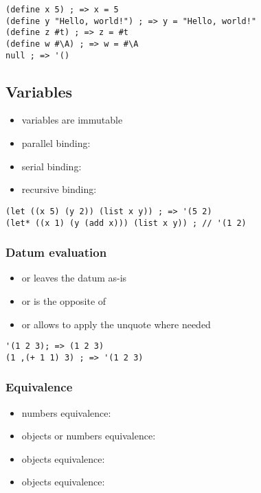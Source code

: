 \documentclass[a4paper,landscape,10pt]{article}
\begin{document}
\begin{multicols*}{2}
  \begin{lstlisting}[language=Racket]
(define x 5) ; => x = 5
(define y "Hello, world!") ; => y = "Hello, world!"
(define z #t) ; => z = #t
(define w #\A) ; => w = #\A
null ; => '()
\end{lstlisting}

  \breakcolumn

  \subsection{Variables}

  \begin{itemize}
    \item variables are immutable
    \item parallel binding: 
    \item serial binding: 
    \item recursive binding: 
  \end{itemize}

  \begin{lstlisting}[language=Racket]
(let ((x 5) (y 2)) (list x y)) ; => '(5 2)
(let* ((x 1) (y (add x))) (list x y)) ; // '(1 2)
\end{lstlisting}

  \subsubsection{Datum evaluation}

  \begin{itemize}
    \item {} or  leaves the datum as-is
    \item {} or  is the opposite of 
    \item {} or  allows to apply the unquote where needed
  \end{itemize}

  \begin{lstlisting}[language=Racket]
'(1 2 3); => (1 2 3)
(1 ,(+ 1 1) 3) ; => '(1 2 3)
\end{lstlisting}

  \subsubsection{Equivalence}

  \begin{itemize}
    \item numbers equivalence: \iracket{=}
    \item objects or numbers equivalence: 
    \item objects equivalence: 
    \item objects equivalence: 
  \end{itemize}


\end{multicols*}
\end{document}
